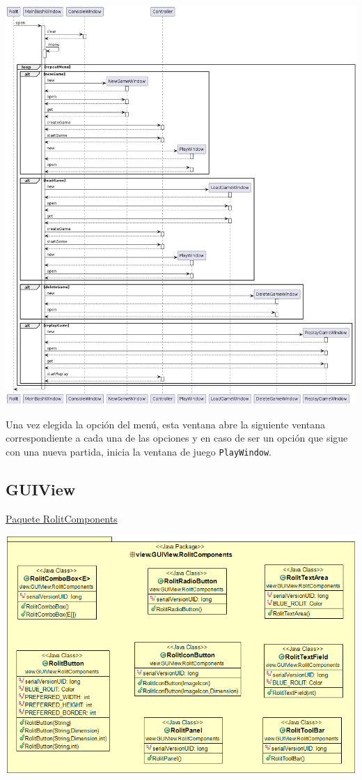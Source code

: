 \documentclass[12pt,a4paper,openright]{book}
\theoremstyle{break}
\begin{document}
\begin{center}
\includegraphics[scale=0.5]{MainBashWindow_final_seq}
\end{center}

Una vez elegida la opción del menú, esta ventana abre la siguiente ventana correspondiente a cada una de las opciones y en caso de ser un opción que sigue con una nueva partida, inicia la ventana de juego \texttt{PlayWindow}.

\newpage

\subsection{GUIView}

\underline{Paquete RolitComponents}
\begin{center}
\includegraphics[scale=0.5]{RolitComponents.png} 
\end{center}
\end{document}
